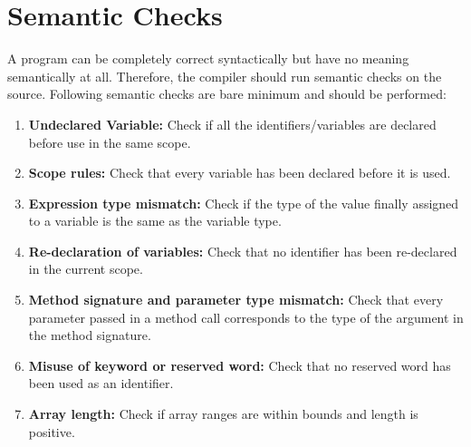 \documentclass{article}
\begin{document}
\section{Semantic Checks}
A program can be completely correct syntactically but have no meaning semantically at all. Therefore, the compiler should run semantic checks on the source. Following semantic checks are bare minimum and should be performed:

\begin{enumerate}
    \item \textbf{Undeclared Variable:} Check if all the identifiers/variables
are declared before use in the same scope.
    \item \textbf{Scope rules:} Check that every variable has been declared before it is used.
    \item \textbf{Expression type mismatch:} Check if the type of the value finally assigned to a variable is the same as the variable type.
    \item \textbf{Re-declaration of variables:} Check that no identifier has been re-declared in the current scope.
    \item \textbf{Method signature and parameter type mismatch:} Check that every parameter passed in a method call corresponds to the type of the argument in the method signature.
    \item \textbf{Misuse of keyword or reserved word:} Check that no reserved word has been used as an identifier.
    \item \textbf{Array length:} Check if array ranges are within bounds and length is positive.
\end{enumerate}
\end{document}
